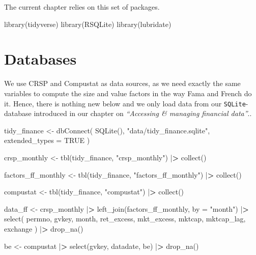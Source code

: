 \documentclass[
]{book}
\newenvironment{Shaded}{\begin{snugshade}}{\end{snugshade}}
\newcommand{\AttributeTok}[1]{\textcolor[rgb]{0.61,0.61,0.61}{#1}}
\newcommand{\ConstantTok}[1]{\textcolor[rgb]{0,0,0}{#1}}
\newcommand{\ErrorTok}[1]{\textcolor[rgb]{0.14,0.14,0.14}{\textbf{#1}}}
\newcommand{\FunctionTok}[1]{\textcolor[rgb]{0,0,0}{#1}}
\newcommand{\NormalTok}[1]{#1}
\newcommand{\OtherTok}[1]{\textcolor[rgb]{0.37,0.37,0.37}{#1}}
\newcommand{\SpecialCharTok}[1]{\textcolor[rgb]{0,0,0}{#1}}
\newcommand{\StringTok}[1]{\textcolor[rgb]{0.5,0.5,0.5}{#1}}
\begin{document}
The current chapter relies on this set of packages.

\begin{Shaded}
\begin{Highlighting}[]
\FunctionTok{library}\NormalTok{(tidyverse)}
\FunctionTok{library}\NormalTok{(RSQLite)}
\FunctionTok{library}\NormalTok{(lubridate)}
\end{Highlighting}
\end{Shaded}

\hypertarget{databases}{%
\section{Databases}\label{databases}}

We use CRSP and Compustat as data sources, as we need exactly the same variables to compute the size and value factors in the way Fama and French do it. Hence, there is nothing new below and we only load data from our \texttt{SQLite}-database introduced in our chapter on \emph{``Accessing \& managing financial data''}..

\begin{Shaded}
\begin{Highlighting}[]
\NormalTok{tidy\_finance }\OtherTok{\textless{}{-}} \FunctionTok{dbConnect}\NormalTok{(}
  \FunctionTok{SQLite}\NormalTok{(), }\StringTok{"data/tidy\_finance.sqlite"}\NormalTok{, }\AttributeTok{extended\_types =} \ConstantTok{TRUE}
\NormalTok{)}

\NormalTok{crsp\_monthly }\OtherTok{\textless{}{-}} \FunctionTok{tbl}\NormalTok{(tidy\_finance, }\StringTok{"crsp\_monthly"}\NormalTok{) }\SpecialCharTok{|}\ErrorTok{\textgreater{}}
  \FunctionTok{collect}\NormalTok{()}

\NormalTok{factors\_ff\_monthly }\OtherTok{\textless{}{-}} \FunctionTok{tbl}\NormalTok{(tidy\_finance, }\StringTok{"factors\_ff\_monthly"}\NormalTok{) }\SpecialCharTok{|}\ErrorTok{\textgreater{}}
  \FunctionTok{collect}\NormalTok{()}

\NormalTok{compustat }\OtherTok{\textless{}{-}} \FunctionTok{tbl}\NormalTok{(tidy\_finance, }\StringTok{"compustat"}\NormalTok{) }\SpecialCharTok{|}\ErrorTok{\textgreater{}}
  \FunctionTok{collect}\NormalTok{()}

\NormalTok{data\_ff }\OtherTok{\textless{}{-}}\NormalTok{ crsp\_monthly }\SpecialCharTok{|}\ErrorTok{\textgreater{}}
  \FunctionTok{left\_join}\NormalTok{(factors\_ff\_monthly, }\AttributeTok{by =} \StringTok{"month"}\NormalTok{) }\SpecialCharTok{|}\ErrorTok{\textgreater{}}
  \FunctionTok{select}\NormalTok{(}
\NormalTok{    permno, gvkey, month, ret\_excess, mkt\_excess,}
\NormalTok{    mktcap, mktcap\_lag, exchange}
\NormalTok{  ) }\SpecialCharTok{|}\ErrorTok{\textgreater{}}
  \FunctionTok{drop\_na}\NormalTok{()}

\NormalTok{be }\OtherTok{\textless{}{-}}\NormalTok{ compustat }\SpecialCharTok{|}\ErrorTok{\textgreater{}}
  \FunctionTok{select}\NormalTok{(gvkey, datadate, be) }\SpecialCharTok{|}\ErrorTok{\textgreater{}}
  \FunctionTok{drop\_na}\NormalTok{()}
\end{Highlighting}
\end{Shaded}
\end{document}
